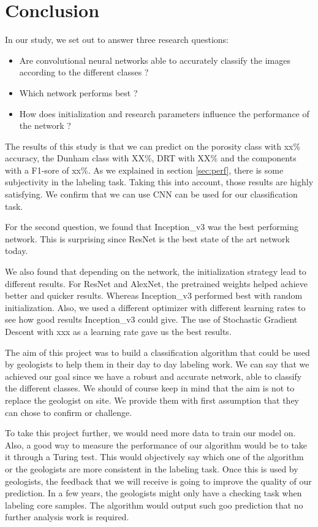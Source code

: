 \chapter{Conclusion}\label{chp:conclusion}
In our study, we set out to answer three research questions: 
\begin{itemize}
    \item Are convolutional neural networks able to accurately classify the images according to the different classes ?
    \item Which network performs best ?
    \item How does initialization and research parameters influence the performance of the network ?
\end{itemize}


The results of this study is that we can predict on the porosity class with xx\% accuracy, the Dunham class with XX\%, DRT with XX\% and the components with a F1-sore of xx\%. As we explained in section \ref{sec:perf}, there is some subjectivity in the labeling task. Taking this into account, those results are highly satisfying. We confirm that we can use CNN can be used for our classification task.

For the second question, we found that Inception\_v3 was the best performing network. This is surprising since ResNet is the best state of the art network today. 

We also found  that depending on the network, the initialization strategy  lead to different results. For ResNet and AlexNet, the pretrained weights helped achieve better and quicker results. Whereas Inception\_v3 performed best with random initialization. Also, we used a different optimizer with different learning rates to see how good results Inception\_v3 could give. The use of Stochastic Gradient Descent with xxx as a learning rate gave us the best results.

The aim of this project was to build a classification algorithm that could be used by geologists to help them in their day to day labeling work. We can say that we achieved our goal since we have a robust and accurate network, able to classify the different classes. We should of course keep in mind that the aim is not to replace the geologist on site. We provide them with first assumption that they can chose to confirm or challenge. 

To take this project further, we would need more data to train our model on. Also, a good way to measure the performance of our algorithm would be to take it through a Turing test. This would objectively say which one of the algorithm or the geologists are more consistent in the labeling task. Once this is used by geologists, the feedback that we will receive is going to improve the quality of our prediction. In a few years, the geologists might only have a checking task when labeling core samples. The algorithm would output such goo prediction that no further analysis work is required.  
